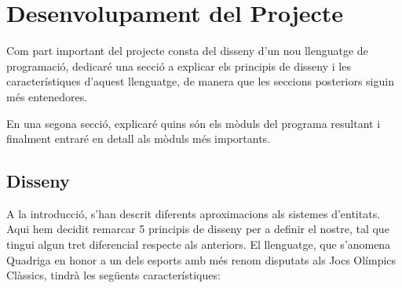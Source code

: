 \chapter{Desenvolupament del Projecte}

Com part important del projecte consta del disseny d'un nou llenguatge de programació, dedicaré una secció a explicar els principis de disseny i les característiques d'aquest llenguatge, de manera que les seccions posteriors siguin més entenedores.

En una segona secció, explicaré quins són els mòduls del programa resultant i finalment entraré en detall als mòduls més importants.

\section{Disseny}

A la introducció, s'han descrit diferents aproximacions als sistemes d'entitats. Aqui hem decidit remarcar 5 principis de disseny per a definir el nostre, tal que tingui algun tret diferencial respecte als anteriors. El llenguatge, que s'anomena Quadriga en honor a un dels esports amb més renom disputats als Jocs Olímpics Clàssics, tindrà les següents característiques:

